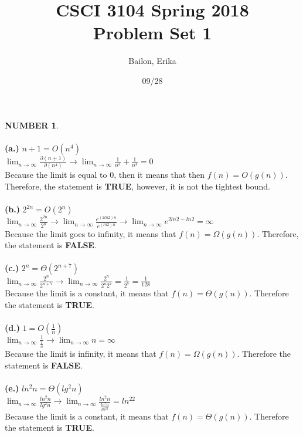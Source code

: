 \documentclass[10pt]{article}
\title{ CSCI 3104 Spring 2018 \\ Problem Set 1}
\author{Bailon, Erika}
\date{09/28}
\begin{document}
\maketitle
\textbf{NUMBER 1}.\\\\
\textbf{(a.)} $n+1 = O(n^4)$\\
$\displaystyle \lim_{n\to \infty} \displaystyle \frac{\partial (n+1)}{\partial (n^4)} \rightarrow \lim_{n\to \infty} \displaystyle \frac{1}{n^3} + \displaystyle \frac{1}{n^4} = 0$\\
Because the limit is equal to 0, then it means that then $f(n) = O(g(n))$. Therefore, the statement is \textbf{TRUE}, however, it is not the tightest bound. \\\\
\textbf{(b.)} $2^{2n} = O(2^n)$\\
$\displaystyle \lim_{n\to \infty} \displaystyle \frac{2^{2n}}{2^n} \rightarrow \lim_{n\to \infty} \displaystyle \frac{e^{(2ln2)n}}{e^{(ln2)n}} \rightarrow \lim_{n\to \infty} \displaystyle e^{2ln2-ln2} = \infty $\\
Because the limit goes to infinity, it means that $f(n) = \Omega(g(n))$. Therefore, the statement is \textbf{FALSE}. \\\\
\textbf{(c.)} $2^n = \Theta (2^{n+7})$\\
$\displaystyle \lim_{n\to \infty} \displaystyle \frac{2^n}{2^{n+7}} \rightarrow \lim_{n\to \infty} \displaystyle \frac{2^n}{2^n2^7}  =  \frac{1}{2^7} = \frac{1}{128}$\\
Because the limit is a constant, it means that $f(n) = \Theta(g(n))$. Therefore the statement is \textbf{TRUE}.\\\\
\textbf{(d.)} $1 = O (\frac{1}{n})$\\
$\displaystyle \lim_{n\to \infty} \displaystyle \frac{1}{\frac{1}{n}} \rightarrow  \lim_{n\to \infty} \displaystyle n = \infty$\\
Because the limit is infinity, it means that $f(n) = \Omega(g(n))$. Therefore the statement is \textbf{FALSE}.\\\\ 
\textbf{(e.)} $ln^2n = \Theta (lg^2n)$\\
$\displaystyle \lim_{n\to \infty} \displaystyle \frac{ln^2n}{lg^2n} \rightarrow \lim_{n\to \infty} \displaystyle \frac{ln^2n}{\frac{ln^2n}{ln^22}} = ln^22$\\
Because the limit is a constant, it means that $f(n) = \Theta(g(n))$. Therefore the statement is \textbf{TRUE}.\\\\
\end{document}
